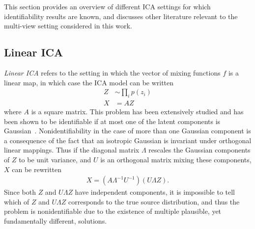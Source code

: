 This section provides an overview of different ICA settings for which identifiability results are known, and discusses other literature relevant to the multi-view setting considered in this work.





\subsection{Linear ICA}\label{subsec:ica-literature-linear-ica}


\emph{Linear ICA} refers to the setting in which the vector of mixing functions $f$ is a linear map, 
in which case the ICA model can be written
%
\begin{align*}
Z &\sim \prod_i p(z_i) \\
X &= AZ
\end{align*}
%
where $A$ is a square matrix.
This problem has been extensively studied and has been shown to be identifiable if at most one of the latent components is Gaussian~\citep{darmois1953analyse, skitovich1954linear, comon1994independent}.
Nonidentifiability in the case of more than one Gaussian component is a consequence of the fact that an isotropic Gaussian is invariant under orthogonal linear mappings.
Thus if the diagonal matrix $\Lambda$ rescales the Gaussian components of $Z$ to be unit variance, and $U$ is an orthogonal matrix mixing these components, $X$ can be rewritten
%
\begin{align*}
X = \left(A\Lambda^{-1}U^{-1} \right) \left(U\Lambda Z\right).
\end{align*}
%
Since both $Z$ and $U\Lambda Z$ have independent components, it is impossible to tell which of $Z$ and ${U}{\Lambda} Z$ corresponds to the true source distribution, and thus the problem is nonidentifiable due to the existence of multiple plausible, yet fundamentally different, solutions.

